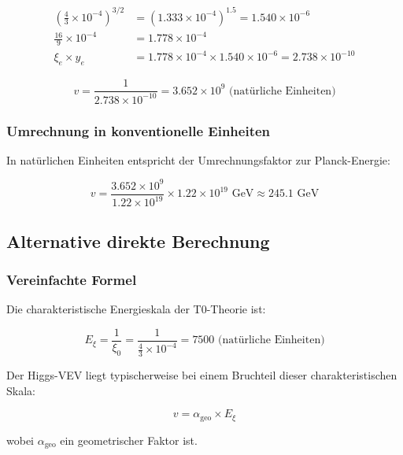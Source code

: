 \documentclass[12pt,a4paper]{article}
\begin{document}
\begin{align}
	\left(\frac{4}{3} \times 10^{-4}\right)^{3/2} &= (1.333 \times 10^{-4})^{1.5} = 1.540 \times 10^{-6}\\
	\frac{16}{9} \times 10^{-4} &= 1.778 \times 10^{-4}\\
	\xi_e \times y_e &= 1.778 \times 10^{-4} \times 1.540 \times 10^{-6} = 2.738 \times 10^{-10}
\end{align}

\begin{equation}
	v = \frac{1}{2.738 \times 10^{-10}} = 3.652 \times 10^9 \text{ (natürliche Einheiten)}
\end{equation}

\subsubsection{Umrechnung in konventionelle Einheiten}

In natürlichen Einheiten entspricht der Umrechnungsfaktor zur Planck-Energie:

\begin{equation}
	v = \frac{3.652 \times 10^9}{1.22 \times 10^{19}} \times 1.22 \times 10^{19} \text{ GeV} \approx 245.1 \text{ GeV}
\end{equation}

\subsection{Alternative direkte Berechnung}

\subsubsection{Vereinfachte Formel}

Die charakteristische Energieskala der T0-Theorie ist:

\begin{equation}
	E_\xi = \frac{1}{\xi_0} = \frac{1}{\frac{4}{3} \times 10^{-4}} = 7500 \text{ (natürliche Einheiten)}
\end{equation}

Der Higgs-VEV liegt typischerweise bei einem Bruchteil dieser charakteristischen Skala:

\begin{equation}
	v = \alpha_{\text{geo}} \times E_\xi
\end{equation}

wobei $\alpha_{\text{geo}}$ ein geometrischer Faktor ist.
\end{document}
